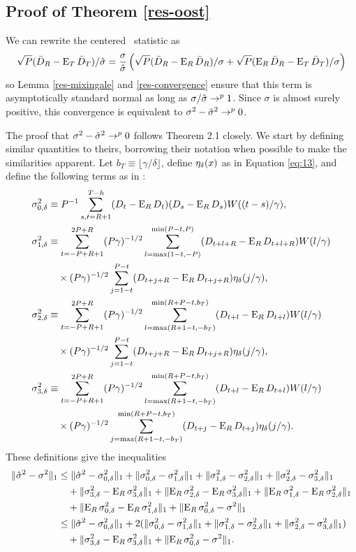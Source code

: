 \documentclass[12pt,draft]{article}
\begin{document}
\subsection*{Proof of Theorem \ref{res-oost}}
We can rewrite the centered \oost\ statistic as
\[
\sqrt{P}(\oosA - \E_T \oosB)/\sh
= \frac{\sigma}{\sh}\, \Big( \sqrt{P}(\oosA - \E_R \oosA)/\sigma
+ \sqrt{P}(\E_R \oosA - \E_T \oosB)/\sigma \Big)
\]
so Lemma \ref{res-mixingale} and \ref{res-convergence} ensure that
this term is asymptotically standard normal as long as $\sigma/\sh
\to^p 1$. Since $\sigma$ is almost surely positive, this convergence
is equivalent to $\sigma^2 - \sh^2 \to^p 0$.

The proof that $\sigma^2 - \sh^2 \to^p 0$ follows 
Theorem 2.1 closely.  We start by defining similar quantities to
theirs, borrowing their notation when possible to make the
similarities apparent. Let $b_T \equiv \lfloor \gamma/\delta \rfloor$,
define $\kernelB{x}$ as in Equation \eqref{eq:13}, and define the following
terms as in \citet{JoD:00}:
\begin{align*}
  \varianceTermI &\equiv
  \varianceTermIDefn,\\ \varianceTermII &\equiv \vtSum
  \varianceTermIIa\\& \quad \times \varianceTermIIb,\\
  \varianceTermIII &\equiv \vtSum \varianceTermIIIa\\
  &\quad \times \varianceTermIIb,\\
  \varianceTermIV &\equiv \vtSum \varianceTermIIIa \\
  &\quad\times \varianceTermIVb.
\end{align*}
These definitions give the inequalities
\begin{align*}
  \lVert \sh^2 - \sigma^2 \rVert_1 &
  \leq \lVert \sh^2 - \varianceTermI \rVert_1
  + \lVert \varianceTermI - \varianceTermII \rVert_1
  + \lVert \varianceTermII - \varianceTermIII \rVert_1
  + \lVert \varianceTermIII - \varianceTermIV \rVert_1\\ & \quad
  + \lVert \varianceTermIV - \E_R \varianceTermIV \rVert_1
  + \lVert \E_R\varianceTermIII - \E_R\varianceTermIV \rVert_1
  + \lVert \E_R\varianceTermII - \E_R\varianceTermIII \rVert_1\\ & \quad
  + \lVert \E_R\varianceTermI - \E_R\varianceTermII \rVert_1
  + \lVert \E_R \varianceTermI - \sigma^2 \rVert_1
  \\ &
  \leq  \lVert \sh^2 - \varianceTermI \rVert_1
  + 2(\lVert \varianceTermI - \varianceTermII \rVert_1
      + \lVert \varianceTermII - \varianceTermIII \rVert_1
      + \lVert \varianceTermIII - \varianceTermIV \rVert_1) \\
  & \quad + \lVert \varianceTermIV - \E_R \varianceTermIV \rVert_1
  + \lVert \E_R \varianceTermI - \sigma^2 \rVert_1.
\end{align*}
\end{document}
